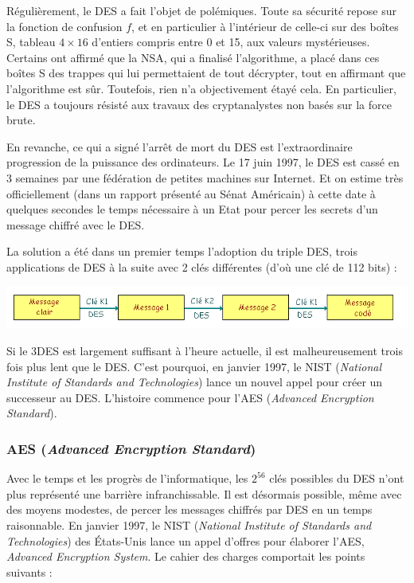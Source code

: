 \documentclass[a4paper,12pt]{article}
\begin{document}
Régulièrement, le DES a fait l'objet de polémiques. Toute sa sécurité repose sur la fonction de confusion $f$, et en particulier à l'intérieur de celle-ci sur des boîtes S, tableau $4 \times 16$ d'entiers compris entre 0 et 15, aux valeurs mystérieuses. Certains ont affirmé que la NSA, qui a finalisé l'algorithme, a placé dans ces boîtes S des trappes qui lui permettaient de tout décrypter, tout en affirmant que l'algorithme est sûr. Toutefois, rien n'a objectivement étayé cela. En particulier, le DES a toujours résisté aux travaux des cryptanalystes non basés sur la force brute.

En revanche, ce qui a signé l'arrêt de mort du DES est l'extraordinaire progression de la puissance des ordinateurs. Le 17 juin 1997, le DES est cassé en 3 semaines par une fédération de petites machines sur Internet. Et on estime très officiellement (dans un rapport présenté au Sénat Américain) à cette date à quelques secondes le temps nécessaire à un Etat pour percer les secrets d'un message chiffré avec le DES.

La solution a été dans un premier temps l'adoption du triple DES, trois applications de DES à la suite avec 2 clés différentes (d'où une clé de 112 bits) :

\begin{center}
  \includegraphics[width=\textwidth]{../Image/3des.png}
\end{center}

Si le 3DES est largement suffisant à l'heure actuelle, il est malheureusement trois fois plus lent que le DES. C'est pourquoi, en janvier 1997, le NIST (\emph{National Institute of Standards and Technologies}) lance un nouvel appel pour créer un successeur au DES. L'histoire commence pour l'AES (\emph{Advanced Encryption Standard}).

\subsubsection{AES (\emph{Advanced Encryption Standard})}

Avec le temps et les progrès de l'informatique, les $2^{56}$ clés possibles du DES n'ont plus représenté une barrière infranchissable. Il est désormais possible, même avec des moyens modestes, de percer les messages chiffrés par DES en un temps raisonnable. En janvier 1997, le NIST (\emph{National Institute of Standards and Technologies}) des \'{E}tats-Unis lance un appel d'offres pour élaborer l'AES, \emph{Advanced Encryption System}. Le cahier des charges comportait les points suivants :
\end{document}
